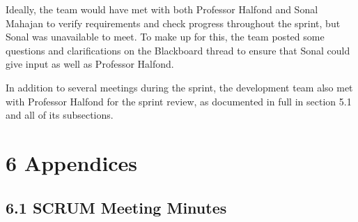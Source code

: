 \documentclass[]{article}
\begin{document}
Ideally, the team would have met with both Professor Halfond and Sonal
Mahajan to verify requirements and check progress throughout the sprint,
but Sonal was unavailable to meet. To make up for this, the team posted
some questions and clarifications on the Blackboard thread to ensure
that Sonal could give input as well as Professor Halfond.

In addition to several meetings during the sprint, the development team
also met with Professor Halfond for the sprint review, as documented in
full in section 5.1 and all of its subsections.

\section{6 Appendices}\label{appendices}

\subsection{6.1 SCRUM Meeting Minutes}\label{scrum-meeting-minutes}
\end{document}

